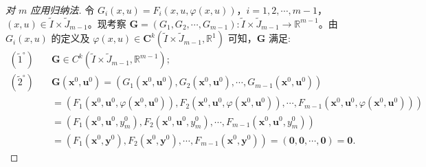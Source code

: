 \begin{proof}[对 $m$ 应用归纳法]
令 $G_{i}(x,u) = F_{i}(x,u,\varphi(x,u))$，$i = 1,2,\cdots,m-1$，$(x,u) \in \widetilde{I} \times \widetilde{J}_{m-1}$。现考察 $\boldsymbol{G} = (G_{1},G_{2},\cdots,G_{m-1}): \widetilde{I} \times \widetilde{J}_{m-1} \to \mathbb{R}^{m-1}$。由 $G_{i}(x,u)$ 的定义及 $\varphi(x,u) \in \boldsymbol{C}^{k}(\widetilde{I} \times \widetilde{J}_{m-1},\mathbb{R}^{1})$ 可知，$\boldsymbol{G}$ 满足:
\begin{align*}
  (\widetilde{1}^{\circ}) \quad & \boldsymbol{G} \in C^{k}(\widetilde{I} \times \widetilde{J}_{m-1},\mathbb{R}^{m-1}); \\
  (\widetilde{2}^{\circ}) \quad & \boldsymbol{G}(\boldsymbol{x}^{0},\boldsymbol{u}^{0}) = (G_{1}(\boldsymbol{x}^{0},\boldsymbol{u}^{0}),G_{2}(\boldsymbol{x}^{0},\boldsymbol{u}^{0}),\cdots,G_{m-1}(\boldsymbol{x}^{0},\boldsymbol{u}^{0})) \\
  &= (F_{1}(\boldsymbol{x}^{0},\boldsymbol{u}^{0},\varphi(\boldsymbol{x}^{0},\boldsymbol{u}^{0})),F_{2}(\boldsymbol{x}^{0},\boldsymbol{u}^{0},\varphi(\boldsymbol{x}^{0},\boldsymbol{u}^{0})),\cdots,F_{m-1}(\boldsymbol{x}^{0},\boldsymbol{u}^{0},\varphi(\boldsymbol{x}^{0},\boldsymbol{u}^{0}))) \\
  &= (F_{1}(\boldsymbol{x}^{0},\boldsymbol{u}^{0},y_{m}^{0}),F_{2}(\boldsymbol{x}^{0},\boldsymbol{u}^{0},y_{m}^{0}),\cdots,F_{m-1}(\boldsymbol{x}^{0},\boldsymbol{u}^{0},y_{m}^{0})) \\
  &= (F_{1}(\boldsymbol{x}^{0},\boldsymbol{y}^{0}),F_{2}(\boldsymbol{x}^{0},\boldsymbol{y}^{0}),\cdots,F_{m-1}(\boldsymbol{x}^{0},\boldsymbol{y}^{0})) = (\boldsymbol{0},\boldsymbol{0},\cdots,\boldsymbol{0}) = \boldsymbol{0}.
\end{align*}


\end{proof}
